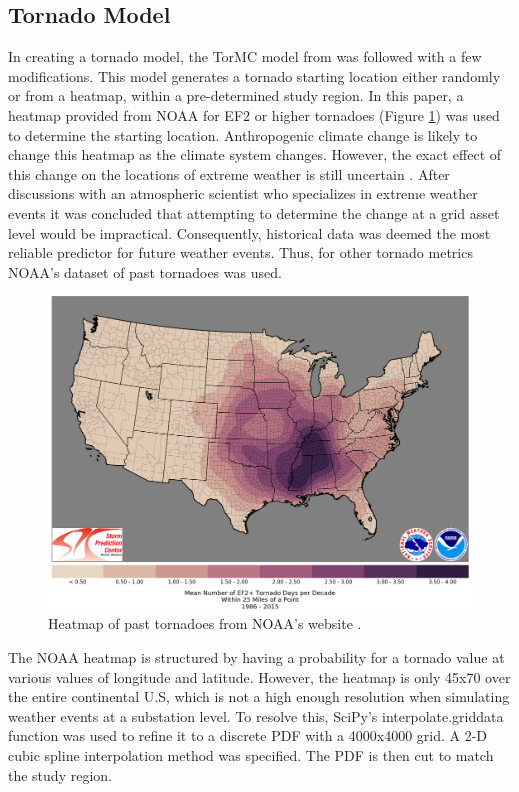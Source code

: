 \documentclass[12pt]{article}
\begin{document}
\subsection{Tornado Model} \label{Tornado Gen}
In creating a tornado model, the TorMC model from \cite{strader} was followed with a few modifications. This model generates a tornado starting location either randomly or from a heatmap, within a pre-determined study region. In this paper, a heatmap provided from NOAA \cite{noaa} for EF2 or higher tornadoes (Figure \ref{fig:noaaheatmap})  was used to determine the starting location. Anthropogenic climate change is likely to change this heatmap as the climate system changes. However, the exact effect of this change on the locations of extreme weather is still uncertain \cite{cheng}. After discussions with an atmospheric scientist who specializes in extreme weather events it was concluded that attempting to determine the change at a grid asset level would be impractical. Consequently, historical data was deemed the most reliable predictor for future weather events. Thus, for other tornado metrics NOAA’s dataset of past tornadoes was used. 
\begin{figure}[ht]
    \centering %
    \includegraphics[width=\textwidth]{noaaheatmap.png}
    \caption[Tornado heatmap from the NOAA website]{Heatmap of past tornadoes from NOAA's website \cite{noaa}.}
    \label{fig:noaaheatmap}
\end{figure}
The NOAA heatmap is structured by having a probability for a tornado value at various values of longitude and latitude. However, the heatmap is only 45x70 over the entire continental U.S, which is not a high enough resolution when simulating weather events at a substation level. To resolve this, SciPy’s interpolate.griddata function was used to refine it to a discrete PDF with a 4000x4000 grid. A 2-D cubic spline interpolation method was specified. The PDF is then cut to match the study region. \par
\end{document}
